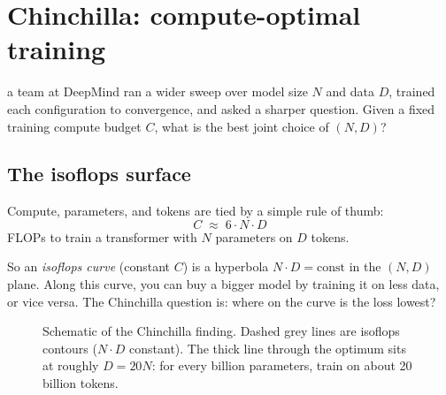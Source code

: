 \section{Chinchilla: compute-optimal training}
\label{ch:chinchilla}

 a team at DeepMind \citep{hoffmann2022training}
ran a wider sweep over model size \(N\) and data \(D\), trained each
configuration to convergence, and asked a sharper question. Given a fixed
training compute budget \(C\), what is the best joint choice of
\((N, D)\)?

\subsection{The isoflops surface}

Compute, parameters, and tokens are tied by a simple rule of thumb:
\begin{equation}
  C \;\approx\; 6 \cdot N \cdot D
  \label{eq:flops}
\end{equation}
FLOPs to train a transformer with \(N\) parameters on \(D\)
tokens.

So an \emph{isoflops curve} (constant \(C\)) is a hyperbola \(N \cdot D =
\text{const}\) in the \((N, D)\) plane. Along this curve, you can buy a
bigger model by training it on less data, or vice versa. The Chinchilla
question is: where on the curve is the loss lowest?

\begin{figure}
\centering
{}
\caption{Schematic of the Chinchilla finding. Dashed grey lines are
isoflops contours (\(N \cdot D\) constant). The thick line through the
optimum sits at roughly \(D = 20 N\): for every billion parameters, train
on about 20 billion tokens.}
\end{figure}

